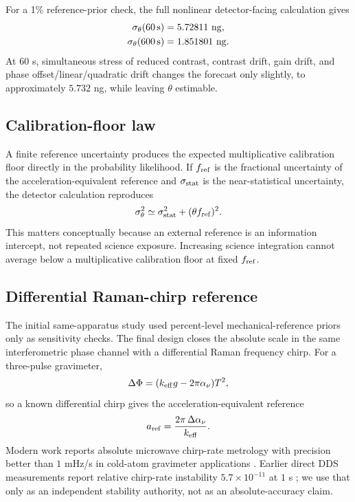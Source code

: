 For a 1\% reference-prior check, the full nonlinear detector-facing calculation gives
\begin{align}
\sigma_\theta(60\,{\rm s})&=5.72811\ {\rm ng},\\
\sigma_\theta(600\,{\rm s})&=1.851801\ {\rm ng}.
\label{eq:detector-forecast}
\end{align}
At $60$ s, simultaneous stress of reduced contrast, contrast drift, gain drift, and phase offset/linear/quadratic drift changes the forecast only slightly, to approximately $5.732$ ng, while leaving $\theta$ estimable.

\subsection{Calibration-floor law}

A finite reference uncertainty produces the expected multiplicative calibration floor directly in the probability likelihood. If $f_{\rm ref}$ is the fractional uncertainty of the acceleration-equivalent reference and $\sigma_{\rm stat}$ is the near-statistical uncertainty, the detector calculation reproduces
\begin{equation}
\sigma_\theta^2\simeq\sigma_{\rm stat}^2+(\theta f_{\rm ref})^2.
\label{eq:floorlaw}
\end{equation}
This matters conceptually because an external reference is an information intercept, not repeated science exposure. Increasing science integration cannot average below a multiplicative calibration floor at fixed $f_{\rm ref}$.

\subsection{Differential Raman-chirp reference}

The initial same-apparatus study used percent-level mechanical-reference priors only as sensitivity checks. The final design closes the absolute scale in the same interferometric phase channel with a differential Raman frequency chirp. For a three-pulse gravimeter,
\begin{equation}
\Delta\Phi=(k_{\rm eff}g-2\pi\alpha_\nu)T^2,
\label{eq:chirp-phase}
\end{equation}
so a known differential chirp gives the acceleration-equivalent reference
\begin{equation}
a_{\rm ref}=\frac{2\pi\,\Delta\alpha_\nu}{k_{\rm eff}}.
\label{eq:chirp-ref}
\end{equation}
Modern work reports absolute microwave chirp-rate metrology with precision better than $1$ mHz/s in cold-atom gravimeter applications \cite{Zhang2025}. Earlier direct DDS measurements report relative chirp-rate instability $5.7\times10^{-11}$ at $1$ s \cite{Tao2015}; we use that only as an independent stability authority, not as an absolute-accuracy claim.

